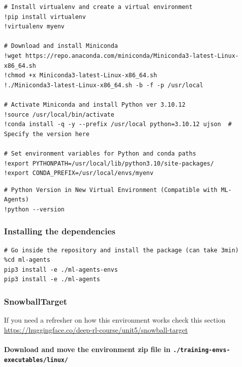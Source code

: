 \documentclass[11pt,a4paper]{article}
\begin{document}
\begin{lstlisting}
# Install virtualenv and create a virtual environment
!pip install virtualenv
!virtualenv myenv

# Download and install Miniconda
!wget https://repo.anaconda.com/miniconda/Miniconda3-latest-Linux-x86_64.sh
!chmod +x Miniconda3-latest-Linux-x86_64.sh
!./Miniconda3-latest-Linux-x86_64.sh -b -f -p /usr/local

# Activate Miniconda and install Python ver 3.10.12
!source /usr/local/bin/activate
!conda install -q -y --prefix /usr/local python=3.10.12 ujson  # Specify the version here

# Set environment variables for Python and conda paths
!export PYTHONPATH=/usr/local/lib/python3.10/site-packages/
!export CONDA_PREFIX=/usr/local/envs/myenv
\end{lstlisting}

\begin{lstlisting}
# Python Version in New Virtual Environment (Compatible with ML-Agents)
!python --version
\end{lstlisting}

\subsubsection{Installing the dependencies}\label{installing-the-dependencies}

\begin{lstlisting}
# Go inside the repository and install the package (can take 3min)
%cd ml-agents
pip3 install -e ./ml-agents-envs
pip3 install -e ./ml-agents
\end{lstlisting}

\subsubsection{SnowballTarget}\label{snowballtarget}

If you need a refresher on how this environment works check this section \url{https://huggingface.co/deep-rl-course/unit5/snowball-target}

\paragraph{\texorpdfstring{Download and move the environment zip file in \texttt{./training-envs-executables/linux/}}{Download and move the environment zip file in ./training-envs-executables/linux/}}\label{download-and-move-the-environment-zip-file-in-.training-envs-executableslinux}
\end{document}
